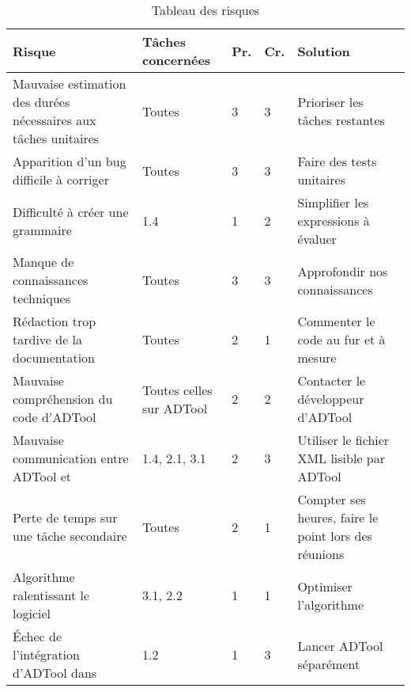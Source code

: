     \begin{table}[H]
        \centering
        \begin{tabular}{|p{4cm}|l|l|l|p{4cm}|}
        	\hline
            \textbf{Risque} & \textbf{Tâches concernées} & \textbf{Pr.} & \textbf{Cr.} & \textbf{Solution}\\
            \hline
            Mauvaise estimation des durées nécessaires aux tâches unitaires & 
                Toutes & 3 & 3 &
                Prioriser les tâches restantes\\ 
            \hline
            Apparition d'un bug difficile à corriger & 
                Toutes & 3 & 3 &
                Faire des tests unitaires\\
            \hline
            Difficulté à créer une grammaire & 
                1.4 & 1 & 2 &
                Simplifier les expressions à évaluer\\ 
            \hline
            Manque de connaissances techniques & 
                Toutes & 3 & 3 &
                Approfondir nos connaissances\\ 
            \hline
            Rédaction trop tardive de la documentation & 
                Toutes & 2 & 1 &
                Commenter le code au fur et à mesure\\
            \hline
            Mauvaise compréhension du code d'ADTool & 
                Toutes celles sur ADTool & 2 & 2 &
                Contacter le développeur d'ADTool\\ 
            \hline
            Mauvaise communication entre ADTool et \glasir{} & 
                1.4, 2.1, 3.1 & 2 & 3 &
                Utiliser le fichier XML lisible par ADTool\\ 
            \hline
            Perte de temps sur une tâche secondaire & 
                Toutes & 2 & 1 &
                Compter ses heures, faire le point lors des réunions\\ 
            \hline
            Algorithme ralentissant le logiciel & 
                3.1, 2.2 & 1 & 1 &
                Optimiser l’algorithme\\ 
            \hline
            Échec de l'intégration d'ADTool dans \glasir{} & 
                1.2 & 1 & 3 &
                Lancer ADTool séparément\\ 
            \hline
        \end{tabular}
        \caption{Tableau des risques}
        \label{fig:risques}
    \end{table}